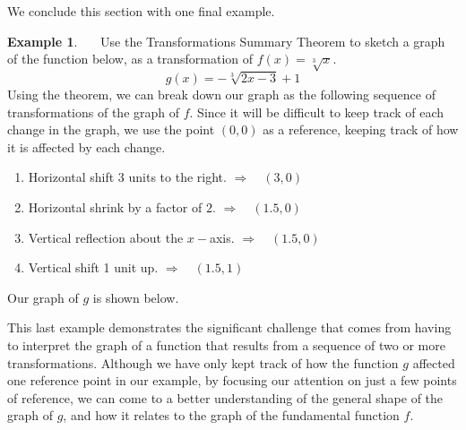 \documentclass[12pt]{book}
\theoremstyle{definition}
\newtheorem{example}{Example}
\begin{document}
\newpage
We conclude this section with one final example.
\begin{example}~~~Use the Transformations Summary Theorem to sketch a graph of the function below, as a transformation of $f(x)=\sqrt[3]{x}$.
$$g(x)=-\sqrt[3]{2x-3}+1$$
Using the theorem, we can break down our graph as the following sequence of transformations of the graph of $f$.  Since it will be difficult to keep track of each change in the graph, we use the point $(0,0)$ as a reference, keeping track of how it is affected by each change.
\begin{enumerate}
	\item Horizontal shift 3 units to the right. $\Rightarrow$~~$(3,0)$
	\item Horizontal shrink by a factor of $2$. $\Rightarrow$~~$(1.5,0)$
	\item Vertical reflection about the $x-$axis. $\Rightarrow$~~$(1.5,0)$
	\item Vertical shift 1 unit up. $\Rightarrow$~~$(1.5,1)$
\end{enumerate}
Our graph of $g$ is shown below.
\begin{center}
\end{center}
\end{example}
This last example demonstrates the significant challenge that comes from having to interpret the graph of a function that results from a sequence of two or more transformations.  Although we have only kept track of how the function $g$ affected one reference point in our example, by focusing our attention on just a few points of reference, we can come to a better understanding of the general shape of the graph of $g$, and how it relates to the graph of the fundamental function $f$.
\newpage
\end{document}

